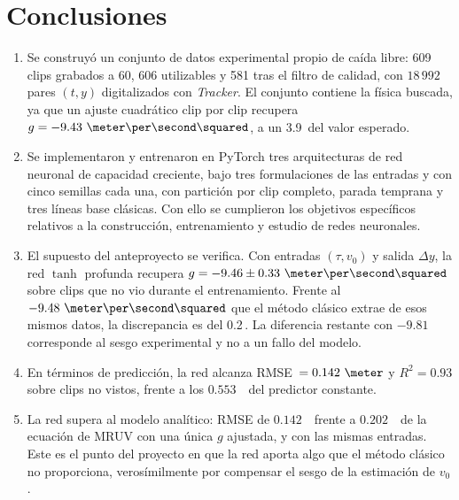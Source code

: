 \documentclass[titlepage,11pt]{article}
\providecommand{\num}[1]{\ensuremath{#1}}
\providecommand{\SI}[2]{#1\,#2}
\providecommand{\percent}{\char37\relax}
\begin{document}
\section{Conclusiones}
\label{sec:conclusiones}

\begin{enumerate}
\item Se construyó un conjunto de datos experimental propio de caída libre: 609
  clips grabados a \unit{60}{\hertz}, 606 utilizables y 581 tras el filtro de
  calidad, con \num{18\,992} pares $(t,y)$ digitalizados con \emph{Tracker}. El
  conjunto contiene la física buscada, ya que un ajuste cuadrático clip por
  clip recupera $g=\num{-9.43}~\meter\per\second\squared$, a un
  \SI{3.9}{\percent} del valor esperado.

\item Se implementaron y entrenaron en PyTorch tres arquitecturas de red
  neuronal de capacidad creciente, bajo tres formulaciones de las entradas y
  con cinco semillas cada una, con partición por clip completo, parada temprana
  y tres líneas base clásicas. Con ello se cumplieron los objetivos específicos
  relativos a la construcción, entrenamiento y estudio de redes neuronales.

\item El supuesto del anteproyecto se verifica. Con entradas $(\tau,v_0)$ y
  salida $\Delta y$, la red $\tanh$ profunda recupera
  $g=\num{-9.46}\pm\num{0.33}~\meter\per\second\squared$ sobre clips que no vio
  durante el entrenamiento. Frente al $\num{-9.48}~\meter\per\second\squared$
  que el método clásico extrae de esos mismos datos, la discrepancia es del
  \SI{0.2}{\percent}. La diferencia restante con $\num{-9.81}$ corresponde al
  sesgo experimental y no a un fallo del modelo.

\item En términos de predicción, la red alcanza RMSE~$=\num{0.142}~\meter$ y
  $R^2=\num{0.93}$ sobre clips no vistos, frente a los \num{0.553}~\meter\ del
  predictor constante.

\item La red supera al modelo analítico: RMSE de \num{0.142}~\meter\ frente a
  \num{0.202}~\meter\ de la ecuación de MRUV con una única $g$ ajustada, y con
  las mismas entradas. Este es el punto del proyecto en que la red aporta algo
  que el método clásico no proporciona, verosímilmente por compensar el sesgo
  de la estimación de $v_0$.


\end{enumerate}
\end{document}

